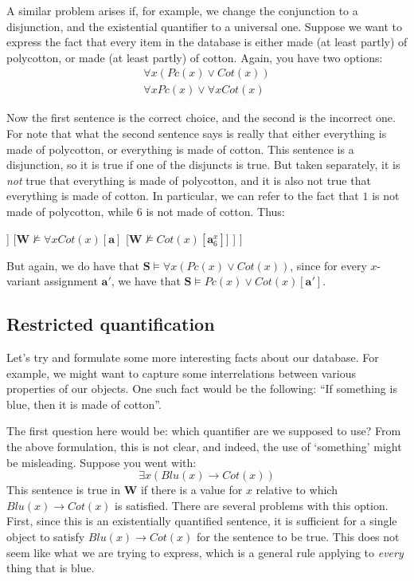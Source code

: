 A similar problem arises if, for example, we change the conjunction to a disjunction, and the existential quantifier to a universal one. Suppose we want to express the fact that every item in the database is either made (at least partly) of polycotton, or made (at least partly) of cotton. Again, you have two options: 
\begin{gather*}
	\forall x (Pc(x) \vee Cot(x))\\
	\forall x Pc(x) \vee \forall x Cot(x)
\end{gather*}

Now the first sentence is the correct choice, and the second is the incorrect one. For note that what the second sentence says is really that either everything is made of polycotton, or everything is made of cotton. This sentence is a disjunction, so it is true if one of the disjuncts is true. But taken separately, it is \textit{not} true that everything is made of polycotton, and it is also not true that everything is made of cotton. In particular, we can refer to the fact that $1$ is not made of polycotton, while $6$ is not made of cotton. Thus:

\begin{center}
\begin{forest}
	[{$\mathbf{W}\not\models\forall x Pc(x) \vee \forall x Cot(x)[\mathbf{a}]$}
		[{$\mathbf{W}\not\models\forall x Pc(x) [\mathbf{a}]$}
			[{$\mathbf{W}\not\models Pc(x) [\mathbf{a}^x_1]$}]
		]
		[{$\mathbf{W}\not\models \forall x Cot(x)[\mathbf{a}]$}
			[{$\mathbf{W}\not\models Cot(x)[\mathbf{a}^x_6]$}]
		]
	]
\end{forest}
\end{center}

But again, we do have that $\mathbf{S} \models \forall x(Pc(x) \vee Cot(x))$, since for every $x$-variant assignment $\mathbf{a}'$, we have that $\mathbf{S} \models Pc(x) \vee Cot(x)[\mathbf{a}']$.

\subsection{Restricted quantification}

Let's try and formulate some more interesting facts about our database. For example, we might want to capture some interrelations between various properties of our objects. One such fact would be the following: ``If something is blue, then it is made of cotton''. 

The first question here would be: which quantifier are we supposed to use? From the above formulation, this is not clear, and indeed, the use of `something' might be misleading. Suppose you went with:
\[
\exists x (Blu(x) \rightarrow Cot(x))
\]
This sentence is true in $\mathbf{W}$ if there is a value for $x$ relative to which $Blu(x) \rightarrow Cot(x)$ is satisfied. There are several problems with this option. First, since this is an existentially quantified sentence, it is sufficient for a single object to satisfy $Blu(x) \rightarrow Cot(x)$ for the sentence to be true. This does not seem like what we are trying to express, which is a general rule applying to \textit{every} thing that is blue. 

